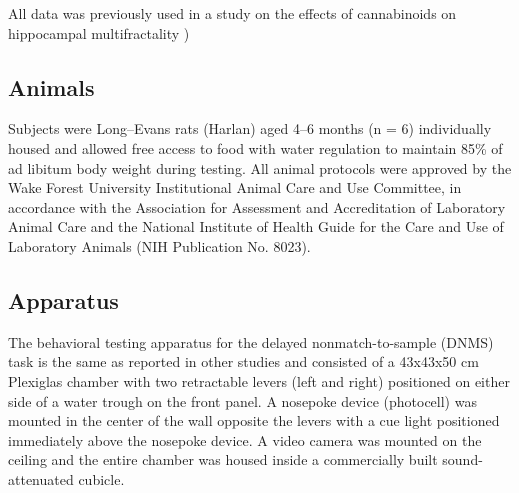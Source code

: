 \documentclass[11pt,a4paper,final]{article}
\begin{document}
All data was previously used in a study on the effects of cannabinoids on hippocampal multifractality \citep{dustin14,dustin15})

    \subsection{Animals}
Subjects were Long–Evans rats (Harlan) aged 4–6 months (n = 6) individually housed and allowed free access to food with water regulation to maintain 85\% of ad libitum body weight during testing.
All animal protocols were approved by the Wake Forest University Institutional Animal Care and Use Committee, in accordance with the Association for Assessment and Accreditation of Laboratory Animal Care and the National Institute of Health Guide for the Care and Use of Laboratory Animals (NIH Publication No. 8023).

    \subsection{Apparatus}
The behavioral testing apparatus for the delayed nonmatch-to-sample (DNMS) task is the same as reported in other studies \citep{hampson00} and consisted of a 43x43x50 cm Plexiglas chamber with two retractable levers (left and right) positioned on either side of a water trough on the front panel.
A nosepoke device (photocell) was mounted in the center of the wall opposite the levers with a cue light positioned immediately above the nosepoke device.
A video camera was mounted on the ceiling and the entire chamber was housed inside a commercially built sound-attenuated cubicle.
\end{document}
